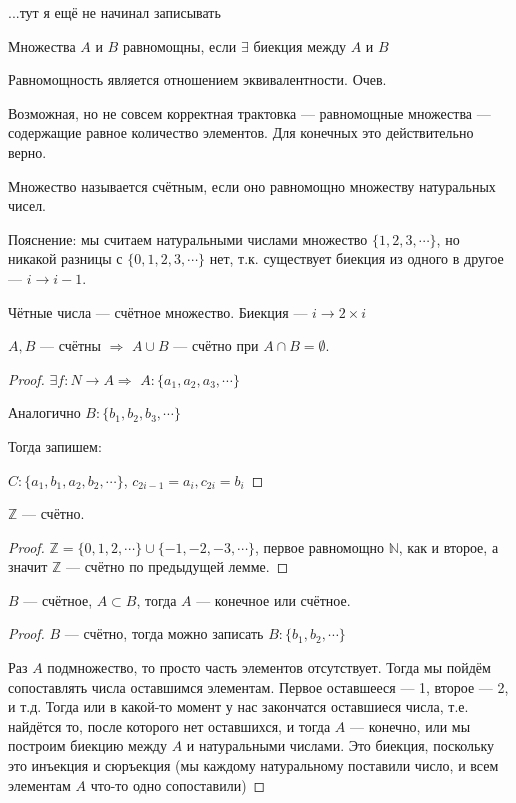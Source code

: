 ...тут я ещё не начинал записывать
\begin{definition}
    Множества $A$ и $B$ равномощны, если $\exists$ биекция между $A$ и $B$ 
\end{definition}
\begin{remark}
	Равномощность является отношением эквивалентности. Очев.
\end{remark}
Возможная, но не совсем корректная трактовка --- равномощные множества --- содержащие равное количество элементов. Для конечных это действительно верно.

\begin{definition}
	Множество называется счётным, если оно равномощно множеству натуральных чисел.
\end{definition}

Пояснение: мы считаем натуральными числами множество $\{1, 2, 3, \cdots\}$, но никакой разницы с $\{0, 1, 2, 3, \cdots\}$ нет, т.к. существует биекция из одного в другое --- $i \to i - 1$.

\begin{example}
	Чётные числа --- счётное множество. Биекция --- $i \to 2 \times i$
\end{example}

\begin{lemma}
$A, B$ --- счётны $\Rightarrow$ $A \cup B$ --- счётно при $A \cap B = \emptyset$.
\end{lemma}
\begin{proof}
	$\exists f: N \to A \Rightarrow$ $A : \{a_1, a_2, a_3, \cdots\}$

	Аналогично $B: \{b_1, b_2, b_3, \cdots\}$

	Тогда запишем:

	$C: \{a_1, b_1, a_2, b_2, \cdots\}$, $c_{2i - 1} = a_i, c_{2i} = b_i$
\end{proof}
\begin{consequence}
$\mathbb{Z}$ --- счётно.
\end{consequence}
\begin{proof}
	$\mathbb{Z} = \{0, 1, 2, \cdots\} \cup \{-1, -2, -3, \cdots\}$, первое равномощно $\mathbb{N}$, как и второе, а значит $\mathbb{Z}$ --- счётно по предыдущей лемме.
\end{proof}
\begin{lemma}
	$B$ --- счётное, $A \subset B$, тогда $A$ --- конечное или счётное.
\end{lemma}
\begin{proof}
	$B$ ---  счётно, тогда можно записать $B: \{b_1, b_2, \cdots\}$

	Раз $A$ подмножество, то просто часть элементов отсутствует. Тогда мы пойдём сопоставлять числа оставшимся элементам. Первое оставшееся --- 1, второе --- 2, и т.д. Тогда или в какой-то момент у нас закончатся оставшиеся числа, т.е. найдётся то, после которого нет оставшихся, и тогда $A$ --- конечно, или мы построим биекцию между $A$ и натуральными числами. Это биекция, поскольку это инъекция и сюръекция (мы каждому натуральному поставили число, и всем элементам $A$ что-то одно сопоставили)
\end{proof}

